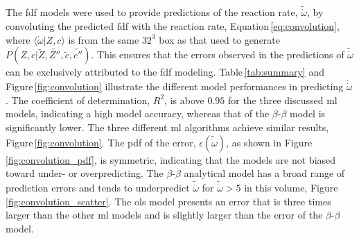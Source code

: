 \documentclass[review]{elsarticle}
\newcommand{\wt}[1]{\widetilde{#1}}
\begin{document}
The \gls{fdf} models were used to provide predictions of the reaction
rate, $\wt{\dot{\omega}}$, by convoluting the predicted \gls{fdf} with
the reaction rate, Equation\,\ref{eq:convolution}, where
$\langle \dot{\omega} | Z, c \rangle$ is from the same $32^3$ box as
that used to generate $P(Z,c | \wt{Z}, \wt{Z''}, \wt{c},
\wt{c''})$. This ensures that the errors observed in the predictions
of $\wt{\dot{\omega}}$ can be exclusively attributed to the \gls{fdf}
modeling. Table\,\ref{tab:summary} and Figure\,\ref{fig:convolution}
illustrate the different model performances in predicting
$\wt{\dot{\omega}}$. The coefficient of determination, $R^2$, is above
$0.95$ for the three discussed \gls{ml} models, indicating a high
model accuracy, whereas that of the $\beta$-$\beta$ model is
significantly lower. The three different \gls{ml} algorithms achieve
similar results, Figure\,\ref{fig:convolution}. The \gls{pdf} of the
error, $\epsilon(\wt{\dot{\omega}})$, as shown in
Figure\,\ref{fig:convolution_pdf}, is symmetric, indicating that the
models are not biased toward under- or overpredicting. The
$\beta$-$\beta$ analytical model has a broad range of prediction
errors and tends to underpredict $\wt{\dot{\omega}}$ for
$\wt{\dot{\omega}} > 5$ in this volume,
Figure\,\ref{fig:convolution_scatter}. The \gls{ols} model presents an
error that is three times larger than the other \gls{ml} models and is
slightly larger than the error of the $\beta$-$\beta$ model.
\end{document}
